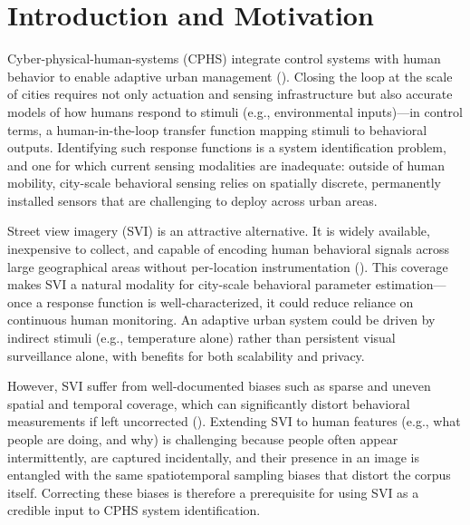 \documentclass{ifacconf}
\begin{document}
\section{Introduction and Motivation}

Cyber-physical-human-systems (CPHS) integrate control systems with human behavior to enable adaptive urban management (\cite{samad2023human}). Closing the loop at the scale of cities requires not only actuation and sensing infrastructure but also accurate models of how humans respond to stimuli (e.g., environmental inputs)---in control terms, a human-in-the-loop transfer function mapping stimuli to behavioral outputs. Identifying such response functions is a system identification problem, and one for which current sensing modalities are inadequate: outside of human mobility, city-scale behavioral sensing relies on spatially discrete, permanently installed sensors that are challenging to deploy across urban areas.

Street view imagery (SVI) is an attractive alternative. It is widely available, inexpensive to collect, and capable of encoding human behavioral signals across large geographical areas without per-location instrumentation (\cite{yin2015bigdata,elrod2025street}). This coverage makes SVI a natural modality for city-scale behavioral parameter estimation---once a response function is well-characterized, it could reduce reliance on continuous human monitoring. An adaptive urban system could be driven by indirect stimuli (e.g., temperature alone) rather than persistent visual surveillance alone, with benefits for both scalability and privacy.

However, SVI suffer from well-documented biases such as sparse and uneven spatial and temporal coverage, which can significantly distort behavioral measurements if left uncorrected (\cite{elrod2026towards}). Extending SVI to human features (e.g., what people are doing, and why) is challenging because people often appear intermittently, are captured incidentally, and their presence in an image is entangled with the same spatiotemporal sampling biases that distort the corpus itself. Correcting these biases is therefore a prerequisite for using SVI as a credible input to CPHS system identification.
\end{document}
